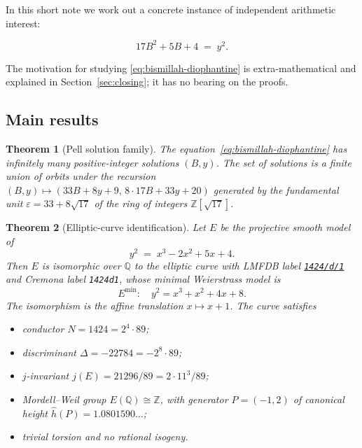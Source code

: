 \documentclass[11pt,a4paper]{article}
\theoremstyle{plain}
\newtheorem{theorem}{Theorem}
\theoremstyle{definition}
\newcommand{\Q}{\mathbb{Q}}
\newcommand{\Z}{\mathbb{Z}}
\newcommand{\LMFDB}[1]{\href{https://www.lmfdb.org/EllipticCurve/Q/#1}{\texttt{#1}}}
\begin{document}
In this short note we work out a concrete instance of independent
arithmetic interest:

\begin{equation}
  \label{eq:bismillah-diophantine}
  17 B^2 + 5 B + 4 \;=\; y^2.
\end{equation}

The motivation for studying \eqref{eq:bismillah-diophantine} is
extra-mathematical and explained in Section~\ref{sec:closing}; it has no
bearing on the proofs.

\subsection{Main results}

\begin{theorem}[Pell solution family]\label{thm:pell-family}
The equation~\eqref{eq:bismillah-diophantine} has infinitely many
positive-integer solutions $(B,y)$. The set of solutions is a finite
union of orbits under the recursion
$(B,y) \mapsto (33B + 8y + 9,\, 8 \cdot 17 B + 33 y + 20)$
generated by the fundamental unit $\varepsilon = 33 + 8\sqrt{17}$
of the ring of integers $\Z[\sqrt{17}]$.
\end{theorem}

\begin{theorem}[Elliptic-curve identification]\label{thm:lmfdb-id}
Let $E$ be the projective smooth model of
\begin{equation}
  \label{eq:E-original}
  y^2 \;=\; x^3 - 2 x^2 + 5 x + 4 .
\end{equation}
Then $E$ is isomorphic over $\Q$ to the elliptic curve with LMFDB
label \LMFDB{1424/d/1} and Cremona label \texttt{1424d1}, whose
minimal Weierstrass model is
\begin{equation*}
  E^{\min} \colon \quad y^2 = x^3 + x^2 + 4x + 8 .
\end{equation*}
The isomorphism is the affine translation $x \mapsto x+1$. The curve
satisfies
\begin{itemize}
\item conductor $N = 1424 = 2^4 \cdot 89$;
\item discriminant $\Delta = -22784 = -2^8 \cdot 89$;
\item $j$-invariant $j(E) = 21296/89 = 2 \cdot 11^3 / 89$;
\item Mordell--Weil group $E(\Q) \cong \Z$, with generator $P = (-1, 2)$
      of canonical height $\hat{h}(P) = 1.0801590\ldots$;
\item trivial torsion and no rational isogeny.
\end{itemize}
\end{theorem}
\end{document}
